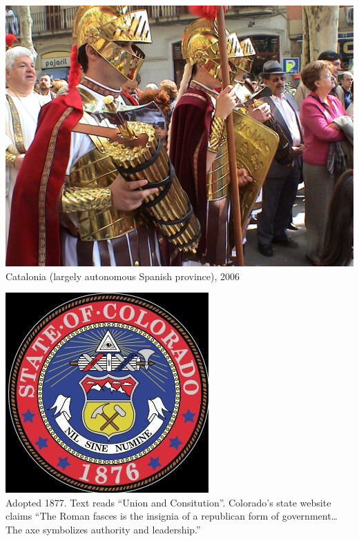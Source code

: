 \begin{frame}
    \centering
    \includegraphics[width=.9\textwidth]{img/fasces/fake-fasces.jpg} \\
    Catalonia (largely autonomous Spanish province), 2006 \\
\end{frame}
\begin{frame}
    \centering
    \includegraphics[height=.8\textheight]{img/fasces/fasces13.jpg} \\
    Adopted 1877. Text reads ``Union and Consitution''. Colorado's state website claims ``The Roman fasces is the insignia of a republican form of government\ldots The axe symbolizes authority and leadership.'' \\
\end{frame}
